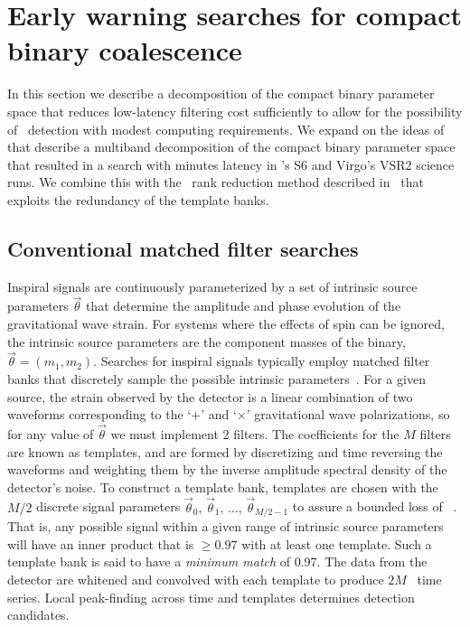 		\section{Early warning searches for compact binary coalescence}
\label{SECII}\label{sec:method}

In this section we describe a decomposition of the compact binary parameter
space that reduces low-latency filtering cost sufficiently to allow for the
possibility of \earlywarning\ detection with modest computing requirements.  We
expand on the ideas of~\cite{Marion2004, Buskulic2010} that describe a
multiband decomposition of the compact binary parameter space that resulted in
a search with minutes latency in \LIGO{}'s S6 and Virgo's VSR2 science runs.
We combine this with the \SVD\ rank reduction method described
in~\cite{Cannon:2010p10398} that exploits the redundancy of the template banks.

\subsection{Conventional \CBC{} matched filter searches}

Inspiral signals are continuously parameterized by a set of intrinsic source
parameters $\vec\theta$ that determine the amplitude and phase evolution of the
gravitational wave strain. For systems where the effects of spin can be
ignored, the intrinsic source parameters are the component masses of the
binary, $\vec\theta = (m_1, m_2)$. Searches for inspiral signals typically
employ matched filter banks that discretely sample the possible intrinsic
parameters~\cite{findchirppaper}.  For a given source, the strain observed by
the detector is a linear combination of two waveforms corresponding to the
`$+$' and `$\times$' gravitational wave polarizations, so for any value of
$\vec\theta$ we must implement 2 filters.  The coefficients for the $M$ filters
are known as templates, and are formed by discretizing and time reversing the
waveforms and weighting them by the inverse amplitude spectral density of the
detector's noise. To construct a template bank, templates are chosen with the
$M/2$ discrete signal parameters $\vec\theta_0,\, \vec\theta_1,\, \dots,\,
\vec\theta_{M/2-1}$ to assure a bounded loss of
\SNR~\cite{Owen:1995tm,Owen:1998dk}. That is, any possible signal within a given range of intrinsic
source parameters will have an inner product that is $\geqslant 0.97$ with at
least one template. Such a template bank is said to have a {\em minimum match}
of 0.97. The data from the detector are whitened and convolved with each
template to produce $2M$ \SNR\ time series. Local peak-finding across time and
templates determines detection candidates.

